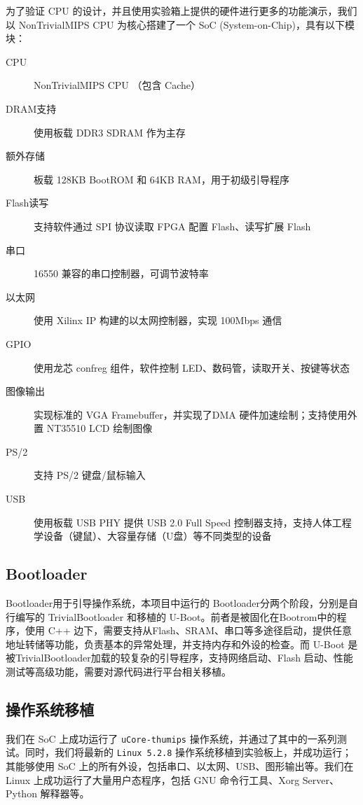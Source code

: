 为了验证 CPU 的设计，并且使用实验箱上提供的硬件进行更多的功能演示，我们以 NonTrivialMIPS CPU 为核心搭建了一个 SoC (System-on-Chip)，具有以下模块：

\begin{description}

    \item[CPU] NonTrivialMIPS CPU （包含 Cache）
    \item[DRAM支持] 使用板载 DDR3 SDRAM 作为主存
    \item[额外存储] 板载 128KB BootROM 和 64KB RAM，用于初级引导程序
    \item[Flash读写] 支持软件通过 SPI 协议读取 FPGA 配置 Flash、读写扩展 Flash
    \item[串口] 16550 兼容的串口控制器，可调节波特率
    \item[以太网] 使用 Xilinx IP 构建的以太网控制器，实现 100Mbps 通信
    \item[GPIO] 使用龙芯 confreg 组件，软件控制 LED、数码管，读取开关、按键等状态
    \item[图像输出] 实现标准的 VGA Framebuffer，并实现了DMA 硬件加速绘制；支持使用外置 NT35510 LCD 绘制图像
    \item[PS/2] 支持 PS/2 键盘/鼠标输入
    \item[USB] 使用板载 USB PHY 提供 USB 2.0 Full Speed 控制器支持，支持人体工程学设备（键鼠）、大容量存储（U盘）等不同类型的设备
\end{description}

\subsection{Bootloader}

Bootloader用于引导操作系统，本项目中运行的 Bootloader分两个阶段，分别是自行编写的 TrivialBootloader 和移植的 U-Boot。前者是被固化在Bootrom中的程序，使用 C++ 边下，需要支持从Flash、SRAM、串口等多途径启动，提供任意地址转储等功能，负责基本的异常处理，并支持内存和外设的检查。而 U-Boot 是被TrivialBootloader加载的较复杂的引导程序，支持网络启动、Flash 启动、性能测试等高级功能，需要对源代码进行平台相关移植。


\subsection{操作系统移植}

我们在 SoC 上成功运行了 \texttt{uCore-thumips} 操作系统，并通过了其中的一系列测试。同时，我们将最新的 \texttt{Linux 5.2.8} 操作系统移植到实验板上，并成功运行；其能够使用 SoC 上的所有外设，包括串口、以太网、USB、图形输出等。我们在 Linux 上成功运行了大量用户态程序，包括 GNU 命令行工具、Xorg Server、Python 解释器等。

